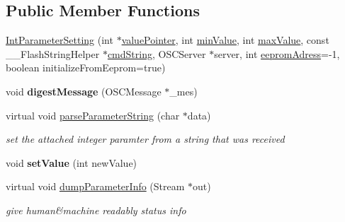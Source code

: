 \subsection*{Public Member Functions}
\begin{DoxyCompactItemize}
\item 
\hyperlink{class_int_parameter_setting_a0e4bce4774ac5253a45f8451e7098236}{Int\-Parameter\-Setting} (int $\ast$\hyperlink{class_int_parameter_setting_a1aa7b8fb26fedb2fc1d6a2aa16939242}{value\-Pointer}, int \hyperlink{class_int_parameter_setting_a182af9fe700c0dd905706d0f1d2f6b4c}{min\-Value}, int \hyperlink{class_int_parameter_setting_a8c60a809a280a808cb792cab9b2b29ff}{max\-Value}, const \-\_\-\-\_\-\-Flash\-String\-Helper $\ast$\hyperlink{class_abstract_parameter_setting_a038edb8c34265166b4d7927cf0ee2776}{cmd\-String}, O\-S\-C\-Server $\ast$server, int \hyperlink{class_int_parameter_setting_abc7b6763da86459663dfe0cadc40b987}{eeprom\-Adress}=-\/1, boolean initialize\-From\-Eeprom=true)
\item 
\hypertarget{class_int_parameter_setting_ab4660fb6cfdf6c65f02969b83e38fc32}{void {\bfseries digest\-Message} (O\-S\-C\-Message $\ast$\-\_\-mes)}\label{class_int_parameter_setting_ab4660fb6cfdf6c65f02969b83e38fc32}

\item 
\hypertarget{class_int_parameter_setting_a29b18523aee3bf2e5ac54633d9c7ac3e}{virtual void \hyperlink{class_int_parameter_setting_a29b18523aee3bf2e5ac54633d9c7ac3e}{parse\-Parameter\-String} (char $\ast$data)}\label{class_int_parameter_setting_a29b18523aee3bf2e5ac54633d9c7ac3e}

\begin{DoxyCompactList}\small\item\em set the attached integer paramter from a string that was received \end{DoxyCompactList}\item 
\hypertarget{class_int_parameter_setting_aa5030252409c1fc489f16fe11ced40af}{void {\bfseries set\-Value} (int new\-Value)}\label{class_int_parameter_setting_aa5030252409c1fc489f16fe11ced40af}

\item 
\hypertarget{class_int_parameter_setting_a1cb2f858b9e61f652863cdd787926885}{virtual void \hyperlink{class_int_parameter_setting_a1cb2f858b9e61f652863cdd787926885}{dump\-Parameter\-Info} (Stream $\ast$out)}\label{class_int_parameter_setting_a1cb2f858b9e61f652863cdd787926885}

\begin{DoxyCompactList}\small\item\em give human\&machine readably status info \end{DoxyCompactList}\end{DoxyCompactItemize}
